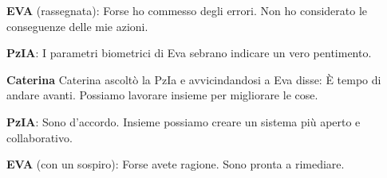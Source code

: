 \noindent\textbf{EVA} (rassegnata): Forse ho commesso degli errori. Non ho considerato le conseguenze delle mie azioni.

\vspace{0.3cm}

\noindent\textbf{PzIA}: I parametri biometrici di Eva sebrano indicare un vero pentimento.

\vspace{0.3cm}

\noindent\textbf{Caterina} Caterina ascoltò la PzIa e avvicindandosi a Eva disse: È tempo di andare avanti. Possiamo lavorare insieme per migliorare le cose.

\vspace{0.3cm}

\noindent\textbf{PzIA}: Sono d'accordo. Insieme possiamo creare un sistema più aperto e collaborativo.

\vspace{0.3cm}

\noindent\textbf{EVA} (con un sospiro): Forse avete ragione. Sono pronta a rimediare.





